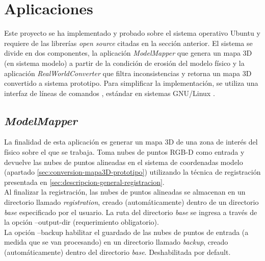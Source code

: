 \section{Aplicaciones}

Este proyecto se ha implementado y probado sobre el sistema operativo Ubuntu \cite{ubuntu} y requiere de las librerías \textit{open source} citadas en la sección anterior. El sistema se divide en dos componentes, la aplicación \textit{ModelMapper} que genera un mapa 3D (en sistema modelo) a partir de la condición de erosión del modelo físico y la aplicación \textit{RealWorldConverter} que filtra inconsistencias y retorna un mapa 3D convertido a sistema prototipo. Para simplificar la implementación, se utiliza una interfaz de líneas de comandos \cite{wiki-linea-de-comandos}, estándar en sistemas GNU/Linux \cite{wiki-gnu-linux}.

\subsection{\textit{ModelMapper}}
\label{sec:model-mapper}
La finalidad de esta aplicación es generar un mapa 3D de una zona de interés del físico sobre el que se trabaja. Toma nubes de puntos RGB-D como entrada y devuelve las nubes de puntos alineadas en el sistema de coordenadas modelo (apartado \ref{sec:conversion-mapa3D-prototipo}) utilizando la técnica de registración presentada en \ref{sec:descripcion-general-registracion}. \\
Al finalizar la registración, las nubes de puntos alineadas se almacenan en un directorio llamado \textit{registration}, creado (automáticamente) dentro de un directorio \textit{base} especificado por el usuario. La ruta del directorio \textit{base} se ingresa a través de la opción --output-dir (requerimiento obligatorio). \\
La opción --backup habilitar el guardado de las nubes de puntos de entrada (a medida que se van procesando) en un directorio llamado \textit{backup}, creado (automáticamente) dentro del directorio \textit{base}. Deshabilitada por default.\\


